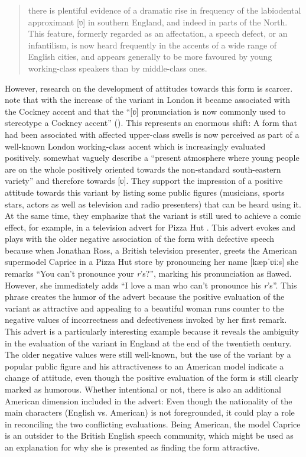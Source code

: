 \begin{quote}
there is plentiful evidence of a dramatic rise in frequency of the labiodental approximant [ʋ] in southern England, and indeed in parts of the North. This feature, formerly regarded as an affectation, a speech defect, or an infantilism, is now heard frequently in the accents of a wide range of English cities, and appears generally to be more favoured by young working-class speakers than by middle-class ones.
\end{quote}

However, research on the development of attitudes towards this form is scarcer. \citet{Foulkes2000} note that with the increase of the variant in London it became associated with the Cockney accent and that the “[ʋ] pronunciation is now commonly used to stereotype a Cockney accent” (\citeyear[37]{Foulkes2000}). This represents an enormous shift: A form that had been associated with affected upper-class swells is now perceived as part of a well-known London working-class accent which is increasingly evaluated positively. \citet[37]{Foulkes2000} somewhat vaguely describe a “present atmosphere where young people are on the whole positively oriented towards the non-standard south-eastern variety” and therefore towards [ʋ]. They support the impression of a positive attitude towards this variant by listing some public figures (musicians, sports stars, actors as well as television and radio presenters) that can be heard using it. At the same time, they emphasize that the variant is still used to achieve a comic effect, for example, in a television advert for Pizza Hut \citep[32]{Foulkes2000}. This advert evokes and plays with the older negative association of the form with defective speech because when Jonathan Ross, a British television presenter, greets the American supermodel Caprice in a Pizza Hut store by pronouncing her name [kæpˈʋiːs] she remarks “You can’t pronounce your \textit{r}’s?”, marking his pronunciation as flawed. However, she immediately adds “I love a man who can’t pronounce his \textit{r}’s”. This phrase creates the humor of the advert because the positive evaluation of the variant as attractive and appealing to a beautiful woman runs counter to the negative values of incorrectness and defectiveness invoked by her first remark. This advert is a particularly interesting example because it reveals the ambiguity in the evaluation of the variant in England at the end of the twentieth century. The older negative values were still well-known, but the use of the variant by a popular public figure and his attractiveness to an American model indicate a change of attitude, even though the positive evaluation of the form is still clearly marked as humorous. Whether intentional or not, there is also an additional American dimension included in the advert: Even though the nationality of the main characters (English vs. American) is not foregrounded, it could play a role in reconciling the two conflicting evaluations. Being American, the model Caprice is an outsider to the British English speech community, which might be used as an explanation for why she is presented as finding the form attractive.

